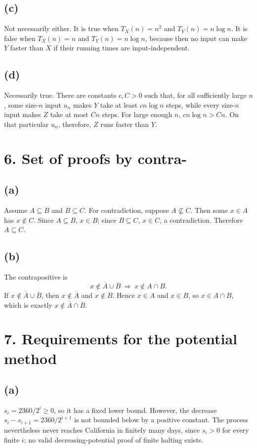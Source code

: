 \documentclass[11pt]{article}
\begin{document}
\subsection*{(c)} Not necessarily either.  It is true when $T_X(n)=n^2$ and $T_Y(n)=n\log n$.  It is false when $T_X(n)=n$ and $T_Y(n)=n\log n$, because then no input can make $Y$ faster than $X$ if their running times are input-independent.
\subsection*{(d)} Necessarily true.  There are constants $c,C>0$ such that, for all sufficiently large $n$, some size-$n$ input $u_n$ makes $Y$ take at least $cn\log n$ steps, while every size-$n$ input makes $Z$ take at most $Cn$ steps.  For large enough $n$, $cn\log n>Cn$.  On that particular $u_n$, therefore, $Z$ runs faster than $Y$.

\section*{6. Set of proofs by contra-}
\subsection*{(a)} Assume $A\subseteq B$ and $B\subseteq C$.  For contradiction, suppose $A\not\subseteq C$.  Then some $x\in A$ has $x\notin C$.  Since $A\subseteq B$, $x\in B$; since $B\subseteq C$, $x\in C$, a contradiction.  Therefore $A\subseteq C$.
\subsection*{(b)} The contrapositive is
\[
x\notin\overline A\cup\overline B\ \Longrightarrow\ x\notin\overline{A\cap B}.
\]
If $x\notin\overline A\cup\overline B$, then $x\notin\overline A$ and $x\notin\overline B$.  Hence $x\in A$ and $x\in B$, so $x\in A\cap B$, which is exactly $x\notin\overline A\cap\overline B$.

\section*{7. Requirements for the potential method}
\subsection*{(a)} $s_i=2360/2^i\ge0$, so it has a fixed lower bound.  However, the decrease $s_i-s_{i+1}=2360/2^{i+1}$ is not bounded below by a positive constant.  The process nevertheless never reaches California in finitely many days, since $s_i>0$ for every finite $i$; no valid decreasing-potential proof of finite halting exists.
\end{document}
